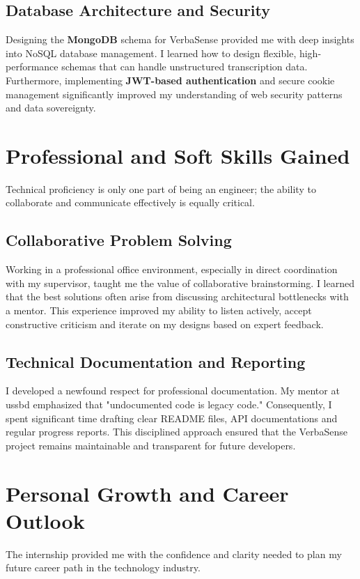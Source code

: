 \documentclass[oneside]{thesis-library}
\begin{document}
\subsection{Database Architecture and Security}
Designing the \textbf{MongoDB} schema for VerbaSense provided me with deep insights into NoSQL database management. I learned how to design flexible, high-performance schemas that can handle unstructured transcription data. Furthermore, implementing \textbf{JWT-based authentication} and secure cookie management significantly improved my understanding of web security patterns and data sovereignty.

\section{Professional and Soft Skills Gained}
Technical proficiency is only one part of being an engineer; the ability to collaborate and communicate effectively is equally critical.

\subsection{Collaborative Problem Solving}
Working in a professional office environment, especially in direct coordination with my supervisor, taught me the value of collaborative brainstorming. I learned that the best solutions often arise from discussing architectural bottlenecks with a mentor. This experience improved my ability to listen actively, accept constructive criticism and iterate on my designs based on expert feedback.

\subsection{Technical Documentation and Reporting}
I developed a newfound respect for professional documentation. My mentor at \Gls{ussbd} emphasized that "undocumented code is legacy code." Consequently, I spent significant time drafting clear README files, API documentations and regular progress reports. This disciplined approach ensured that the VerbaSense project remains maintainable and transparent for future developers.

\section{Personal Growth and Career Outlook}
The internship provided me with the confidence and clarity needed to plan my future career path in the technology industry.
\end{document}
